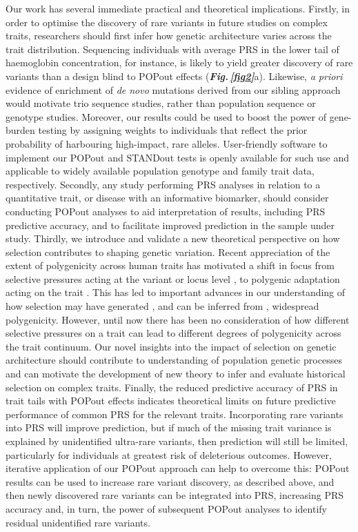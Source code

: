 \documentclass[12pt]{zHenriquesLab-StyleBioRxiv}
\newcommand\fref[1]{\normalsize{\textbf{\textit{Fig.\,\ref{#1}}}}\normalsize{}}
\begin{document}
{{Our work has several immediate practical and theoretical implications. 
Firstly, in order to optimise the discovery of rare variants in future 
studies on complex traits, researchers should first infer how genetic 
architecture varies across the trait distribution. 
Sequencing individuals with average PRS in the lower tail of 
haemoglobin concentration, for instance, is likely to yield greater 
discovery of rare variants than a design blind to POPout 
effects (\fref{fig2}{a}). Likewise, \emph{a priori} evidence of enrichment of \emph{de 
novo} mutations derived from our sibling approach \cite{Souaiaia2024} 
would motivate trio sequence studies, rather than population 
sequence or genotype studies. Moreover, our results could be 
used to boost the power of gene-burden testing \cite{Lee2012}
by assigning weights to individuals that reflect the prior probability 
of harbouring high-impact, rare alleles. User-friendly software 
to implement our POPout and STANDout tests is openly available 
for such use and applicable to widely available population 
genotype and family trait data, respectively. Secondly, 
any study performing PRS analyses in relation to a quantitative trait, 
or disease with an informative biomarker, should consider 
conducting POPout analyses to aid interpretation of results, 
including PRS predictive accuracy, and to facilitate improved prediction 
in the sample under study. Thirdly, we introduce and validate a new 
theoretical perspective on how selection contributes 
to shaping genetic variation. Recent appreciation of the extent 
of polygenicity across human traits has motivated a shift 
in focus from selective pressures acting at the 
variant or locus level \cite{Sabeti2002,Paul2008}, 
to polygenic adaptation acting on the trait \cite{Pritchard2010,Hollinger2019}. 
This has led to important advances in our understanding 
of how selection may have generated \cite{Oconnor2019}, 
and can be inferred from \cite{Barghi2020}, 
widespread polygenicity. However, until now there has been 
no consideration of how different selective pressures on a trait 
can lead to different degrees of polygenicity across the trait continuum. 
Our novel insights into the impact of selection on genetic architecture 
should contribute to understanding of population genetic processes and can motivate 
the development of new theory to infer and evaluate historical selection on complex traits. 
Finally, the reduced predictive accuracy of PRS in trait tails 
with POPout effects indicates theoretical limits on future predictive 
performance of common PRS for the relevant traits. 
Incorporating rare variants into PRS will improve prediction, but if much of 
the missing trait variance is explained by unidentified ultra-rare variants, 
then prediction will still be limited, particularly for individuals at greatest risk of deleterious outcomes. 
However, iterative application of our POPout approach can help to overcome this: POPout results 
can be used to increase rare variant discovery, as described above, and then newly discovered rare 
variants can be integrated into PRS, increasing PRS accuracy and, in turn, the power of subsequent 
POPout analyses to identify residual unidentified rare variants. 

}}
\end{document}
